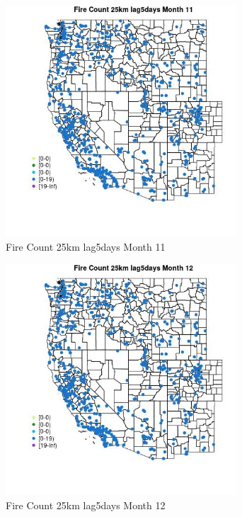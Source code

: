 \begin{figure} 
\centering  
\includegraphics[width=0.77\textwidth]{Code_Outputs/Report_ML_input_PM25_Step4_part_e_de_duplicated_aves_compiled_2019-05-21wNAs_MapObsMo11Fire_Count_25km_lag5days.jpg} 
\caption{\label{fig:Report_ML_input_PM25_Step4_part_e_de_duplicated_aves_compiled_2019-05-21wNAsMapObsMo11Fire_Count_25km_lag5days}Fire Count 25km lag5days Month 11} 
\end{figure} 
 

\begin{figure} 
\centering  
\includegraphics[width=0.77\textwidth]{Code_Outputs/Report_ML_input_PM25_Step4_part_e_de_duplicated_aves_compiled_2019-05-21wNAs_MapObsMo12Fire_Count_25km_lag5days.jpg} 
\caption{\label{fig:Report_ML_input_PM25_Step4_part_e_de_duplicated_aves_compiled_2019-05-21wNAsMapObsMo12Fire_Count_25km_lag5days}Fire Count 25km lag5days Month 12} 
\end{figure} 
 

